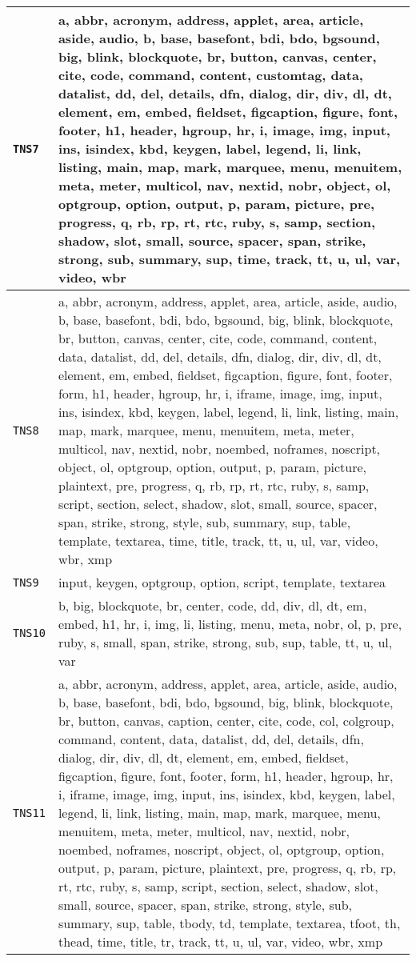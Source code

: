 \begin{table}[!t]
\begin{tabular}{l|p{}}
\midrule
\small \texttt{TNS7} & \tiny {a, abbr, acronym, address, applet, area, article, aside, audio, b, base, basefont, bdi, bdo, bgsound, big, blink, blockquote, br, button, canvas, center, cite, code, command, content, customtag, data, datalist, dd, del, details, dfn, dialog, dir, div, dl, dt, element, em, embed, fieldset, figcaption, figure, font, footer, h1, header, hgroup, hr, i, image, img, input, ins, isindex, kbd, keygen, label, legend, li, link, listing, main, map, mark, marquee, menu, menuitem, meta, meter, multicol, nav, nextid, nobr, object, ol, optgroup, option, output, p, param, picture, pre, progress, q, rb, rp, rt, rtc, ruby, s, samp, section, shadow, slot, small, source, spacer, span, strike, strong, sub, summary, sup, time, track, tt, u, ul, var, video, wbr} \\
\midrule
\small \texttt{TNS8} & \tiny {a, abbr, acronym, address, applet, area, article, aside, audio, b, base, basefont, bdi, bdo, bgsound, big, blink, blockquote, br, button, canvas, center, cite, code, command, content, data, datalist, dd, del, details, dfn, dialog, dir, div, dl, dt, element, em, embed, fieldset, figcaption, figure, font, footer, form, h1, header, hgroup, hr, i, iframe, image, img, input, ins, isindex, kbd, keygen, label, legend, li, link, listing, main, map, mark, marquee, menu, menuitem, meta, meter, multicol, nav, nextid, nobr, noembed, noframes, noscript, object, ol, optgroup, option, output, p, param, picture, plaintext, pre, progress, q, rb, rp, rt, rtc, ruby, s, samp, script, section, select, shadow, slot, small, source, spacer, span, strike, strong, style, sub, summary, sup, table, template, textarea, time, title, track, tt, u, ul, var, video, wbr, xmp} \\
\midrule
\small \texttt{TNS9} & \tiny {input, keygen, optgroup, option, script, template, textarea} \\
\midrule
\small \texttt{TNS10} & \tiny {b, big, blockquote, br, center, code, dd, div, dl, dt, em, embed, h1, hr, i, img, li, listing, menu, meta, nobr, ol, p, pre, ruby, s, small, span, strike, strong, sub, sup, table, tt, u, ul, var} \\
\midrule
\small \texttt{TNS11} & \tiny {a, abbr, acronym, address, applet, area, article, aside, audio, b, base, basefont, bdi, bdo, bgsound, big, blink, blockquote, br, button, canvas, caption, center, cite, code, col, colgroup, command, content, data, datalist, dd, del, details, dfn, dialog, dir, div, dl, dt, element, em, embed, fieldset, figcaption, figure, font, footer, form, h1, header, hgroup, hr, i, iframe, image, img, input, ins, isindex, kbd, keygen, label, legend, li, link, listing, main, map, mark, marquee, menu, menuitem, meta, meter, multicol, nav, nextid, nobr, noembed, noframes, noscript, object, ol, optgroup, option, output, p, param, picture, plaintext, pre, progress, q, rb, rp, rt, rtc, ruby, s, samp, script, section, select, shadow, slot, small, source, spacer, span, strike, strong, style, sub, summary, sup, table, tbody, td, template, textarea, tfoot, th, thead, time, title, tr, track, tt, u, ul, var, video, wbr, xmp} \\

\end{tabular}
\end{table}
